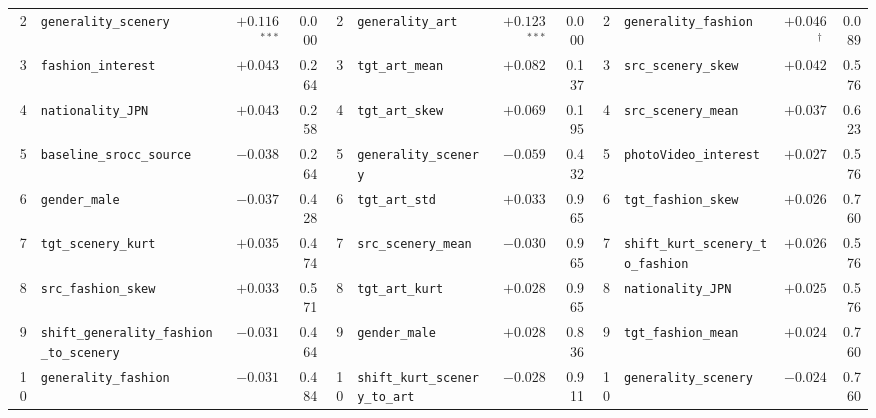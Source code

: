 \begin{table}[t]
\begin{tabular}{rlrr@{\hspace{8pt}}rlrr@{\hspace{8pt}}rlrr}
2 & \texttt{generality\_scenery} & $+0.116$$^{***}$ & 0.000 & 2 & \texttt{generality\_art} & $+0.123$$^{***}$ & 0.000 & 2 & \texttt{generality\_fashion} & $+0.046$$^{\dagger}$ & 0.089 \\
3 & \texttt{fashion\_interest} & $+0.043$ & 0.264 & 3 & \texttt{tgt\_art\_mean} & $+0.082$ & 0.137 & 3 & \texttt{src\_scenery\_skew} & $+0.042$ & 0.576 \\
4 & \texttt{nationality\_JPN} & $+0.043$ & 0.258 & 4 & \texttt{tgt\_art\_skew} & $+0.069$ & 0.195 & 4 & \texttt{src\_scenery\_mean} & $+0.037$ & 0.623 \\
5 & \texttt{baseline\_srocc\_source} & $-0.038$ & 0.264 & 5 & \texttt{generality\_scenery} & $-0.059$ & 0.432 & 5 & \texttt{photoVideo\_interest} & $+0.027$ & 0.576 \\
6 & \texttt{gender\_male} & $-0.037$ & 0.428 & 6 & \texttt{tgt\_art\_std} & $+0.033$ & 0.965 & 6 & \texttt{tgt\_fashion\_skew} & $+0.026$ & 0.760 \\
7 & \texttt{tgt\_scenery\_kurt} & $+0.035$ & 0.474 & 7 & \texttt{src\_scenery\_mean} & $-0.030$ & 0.965 & 7 & \texttt{shift\_kurt\_scenery\_to\_fashion} & $+0.026$ & 0.576 \\
8 & \texttt{src\_fashion\_skew} & $+0.033$ & 0.571 & 8 & \texttt{tgt\_art\_kurt} & $+0.028$ & 0.965 & 8 & \texttt{nationality\_JPN} & $+0.025$ & 0.576 \\
9 & \texttt{shift\_generality\_fashion\_to\_scenery} & $-0.031$ & 0.464 & 9 & \texttt{gender\_male} & $+0.028$ & 0.836 & 9 & \texttt{tgt\_fashion\_mean} & $+0.024$ & 0.760 \\
10 & \texttt{generality\_fashion} & $-0.031$ & 0.484 & 10 & \texttt{shift\_kurt\_scenery\_to\_art} & $-0.028$ & 0.911 & 10 & \texttt{generality\_scenery} & $-0.024$ & 0.760 \\
\bottomrule
\end{tabular}
\end{table}
